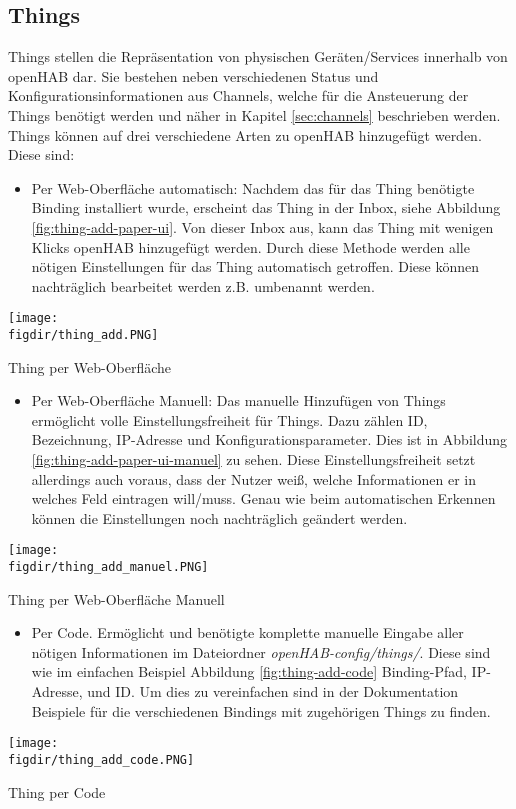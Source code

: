 \subsection{Things}
Things stellen die Repräsentation von physischen Geräten/Services innerhalb von openHAB dar. Sie bestehen neben verschiedenen Status und Konfigurationsinformationen aus Channels, welche für die Ansteuerung der Things benötigt werden und näher in Kapitel \ref{sec:channels} beschrieben werden.
Things können auf drei verschiedene Arten zu openHAB hinzugefügt werden. Diese sind:
\begin{itemize}
	\item Per Web-Oberfläche automatisch: Nachdem das für das Thing benötigte Binding installiert wurde, erscheint das Thing in der Inbox, siehe Abbildung \ref{fig:thing-add-paper-ui}. Von dieser Inbox aus, kann das Thing mit wenigen Klicks openHAB hinzugefügt werden. Durch diese Methode werden alle nötigen Einstellungen für das Thing automatisch getroffen. Diese können nachträglich bearbeitet werden z.B. umbenannt werden. 
\end{itemize}
{\centering
\captionsetup{type=figure}
\texttt{[image: \\figdir/thing\_add.PNG]}
\caption{Thing per Web-Oberfläche \label{fig:thing-add-paper-ui}}
}	
\begin{itemize}	
	\item Per Web-Oberfläche Manuell: Das manuelle Hinzufügen von Things ermöglicht volle Einstellungsfreiheit für Things. Dazu zählen ID, Bezeichnung, IP-Adresse und Konfigurationsparameter. Dies ist in Abbildung \ref{fig:thing-add-paper-ui-manuel} zu sehen. Diese Einstellungsfreiheit setzt allerdings auch voraus, dass der Nutzer weiß, welche Informationen er in welches Feld eintragen will/muss. Genau wie beim automatischen Erkennen können die Einstellungen noch nachträglich geändert werden. 
\end{itemize}
{
	\centering
	\captionsetup{type=figure}
	\texttt{[image: \\figdir/thing\_add\_manuel.PNG]}
	\caption{Thing per Web-Oberfläche Manuell \label{fig:thing-add-paper-ui-manuel}}
}
\begin{itemize}	
	\item Per Code. Ermöglicht und benötigte komplette manuelle Eingabe aller nötigen Informationen im Dateiordner  \textit{openHAB-config/things/}. Diese sind wie im einfachen Beispiel Abbildung \ref{fig:thing-add-code} Binding-Pfad, IP-Adresse, und ID. Um dies zu vereinfachen sind in der Dokumentation Beispiele für die verschiedenen Bindings mit zugehörigen Things zu finden.
\end{itemize}
{
	\centering
	\captionsetup{type=figure}
	\texttt{[image: \\figdir/thing\_add\_code.PNG]}
	\caption{Thing per Code \label{fig:thing-add-code}}
}

